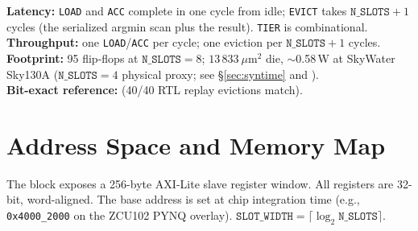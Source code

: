 \documentclass[11pt]{article}
\begin{document}
\medskip
\noindent\textbf{Latency:} \texttt{LOAD} and \texttt{ACC} complete in one cycle
from idle; \texttt{EVICT} takes $\texttt{N\_SLOTS}+1$ cycles (the serialized
argmin scan plus the result). \texttt{TIER} is combinational.\\
\textbf{Throughput:} one \texttt{LOAD}/\texttt{ACC} per cycle; one eviction per
$\texttt{N\_SLOTS}+1$ cycles.\\
\textbf{Footprint:} 95 flip-flops at $\texttt{N\_SLOTS}=8$; $13\,833~\mu$m$^2$
die, $\sim$0.58\,\textmu W at SkyWater Sky130A ($\texttt{N\_SLOTS}=4$ physical
proxy; see \S\ref{sec:syntime} and ).\\
\textbf{Bit-exact reference:}  (40/40 RTL
replay evictions match).

\section{Address Space and Memory Map}
\label{sec:memmap}

The block exposes a 256-byte AXI-Lite slave register window. All registers are
32-bit, word-aligned. The base address is set at chip integration time (e.g.,
\texttt{0x4000\_2000} on the ZCU102 PYNQ overlay). $\texttt{SLOT\_WIDTH} =
\lceil\log_2\texttt{N\_SLOTS}\rceil$.
\end{document}
